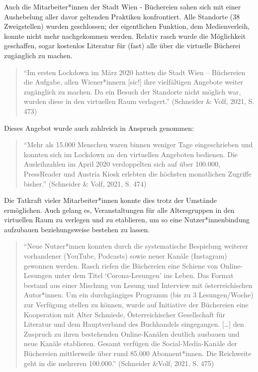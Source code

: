 \documentclass[a4paper,
fontsize=11pt,
oneside,
numbers=noperiodatend,
parskip=half-,
bibliography=totoc,
final
]{scrartcl}
\begin{document}
Auch die Mitarbeiter*innen der Stadt Wien - Büchereien sahen sich mit
einer Aushebelung aller davor geltenden Praktiken konfrontiert. Alle
Standorte (38 Zweigstellen) wurden geschlossen; der eigentlichen
Funktion, dem Medienverleih, konnte nicht mehr nachgekommen werden.
Relativ rasch wurde die Möglichkeit geschaffen, sogar kostenlos
Literatur für (fast) alle über die virtuelle Bücherei zugänglich zu
machen.

\begin{quote}
\enquote{Im ersten Lockdown im März 2020 hatten die Stadt Wien --
Büchereien die Aufgabe, allen Wiener*innern {[}sic!{]} ihre vielfältigen
Angebote weiter zugänglich zu machen. Da ein Besuch der Standorte nicht
möglich war, wurden diese in den virtuellen Raum verlagert.} (Schneider
\& Volf, 2021, S. 473)
\end{quote}

Dieses Angebot wurde auch zahlreich in Anspruch genommen:

\begin{quote}
\enquote{Mehr als 15.000 Menschen waren binnen weniger Tage
eingeschrieben und konnten sich im Lockdown an den virtuellen Angeboten
bedienen. Die Ausleihzahlen im April 2020 verdoppelten sich auf über
100.000, PressReader und Austria Kiosk erlebten die höchsten monatlichen
Zugriffe bisher.} (Schneider \& Volf, 2021, S. 474)
\end{quote}

Die Tatkraft vieler Mitarbeiter*innen konnte dies trotz der Umstände
ermöglichen. Auch gelang es, Veranstaltungen für alle Altersgruppen in
den virtuellen Raum zu verlegen und zu etablieren, um so eine
Nutzer*innenbindung aufzubauen beziehungsweise bestehen zu lassen.

\begin{quote}
\enquote{Neue Nutzer*innen konnten durch die systematische Bespielung
weiterer vorhandener (YouTube, Podcasts) sowie neuer Kanäle (Instagram)
gewonnen werden. Rasch riefen die Büchereien eine Schiene von
Online-Lesungen unter dem Titel \enquote*{Corona-Lesungen} ins Leben. Das Format
bestand aus einer Mischung von Lesung und Interview mit österreichischen
Autor*innen. Um ein durchgängiges Programm (bis zu 3 Lesungen/Woche) zur
Verfügung stellen zu können, wurde auf Initiative der Büchereien eine
Kooperation mit Alter Schmiede, Österreichischer Gesellschaft für
Literatur und dem Hauptverband des Buchhandels eingegangen. {[}\ldots{]}
den Zuspruch zu ihren bestehenden Online-Kanälen deutlich ausbauen und
neue Kanäle etablieren. Gesamt verfügen die Social-Media-Kanäle der
Büchereien mittlerweile über rund 85.000 Abonnent*innen. Die Reichweite geht in die mehreren 100.000.} (Schneider \&Volf, 2021, S. 475)
\end{quote}
\end{document}
